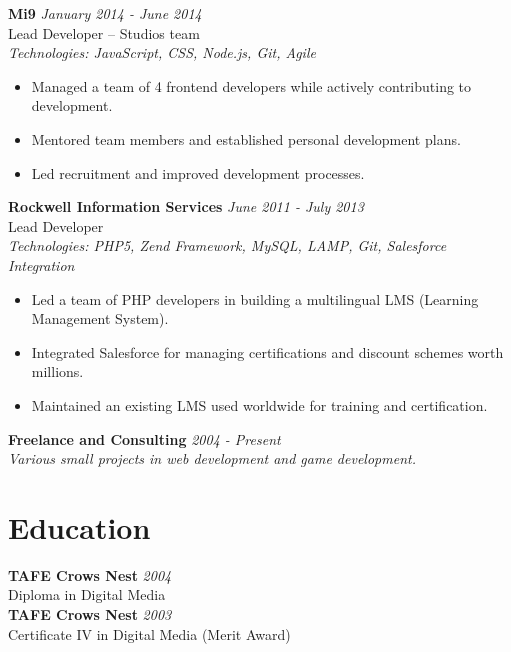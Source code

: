 \documentclass[a4paper,10pt]{article}
\begin{document}
\textbf{Mi9} \hfill \textit{January 2014 - June 2014}  \\
Lead Developer – Studios team  \\
\textit{Technologies: JavaScript, CSS, Node.js, Git, Agile}
\begin{itemize}
    \item Managed a team of 4 frontend developers while actively contributing to development.
    \item Mentored team members and established personal development plans.
    \item Led recruitment and improved development processes.
\end{itemize}

\textbf{Rockwell Information Services} \hfill \textit{June 2011 - July 2013}  \\
Lead Developer  \\
\textit{Technologies: PHP5, Zend Framework, MySQL, LAMP, Git, Salesforce Integration}
\begin{itemize}
    \item Led a team of PHP developers in building a multilingual LMS (Learning Management System).
    \item Integrated Salesforce for managing certifications and discount schemes worth millions.
    \item Maintained an existing LMS used worldwide for training and certification.
\end{itemize}

\textbf{Freelance and Consulting} \hfill \textit{2004 - Present}  \\
\textit{Various small projects in web development and game development.}

\section*{Education}

\textbf{TAFE Crows Nest} \hfill \textit{2004}  \\
Diploma in Digital Media  \\
\textbf{TAFE Crows Nest} \hfill \textit{2003}  \\
Certificate IV in Digital Media (Merit Award)
\end{document}

